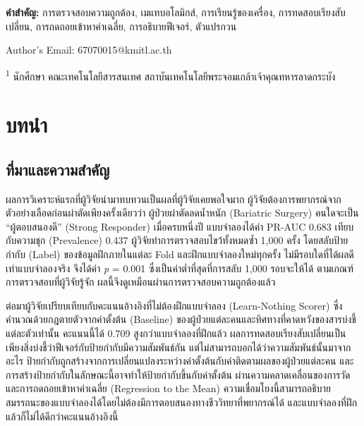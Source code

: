 \documentclass[11pt,a4paper]{article}
\begin{document}
\vspace{1em}
\noindent\textbf{คำสำคัญ:} การตรวจสอบความถูกต้อง, เมแทบอโลมิกส์, การเรียนรู้ของเครื่อง,
การทดสอบเรียงสับเปลี่ยน, การถดถอยเข้าหาค่าเฉลี่ย, การอธิบายฟีเจอร์, ตัวแปรกวน

\vfill
\noindent{}\par
{\small
\noindent * Author's Email: 67070015@kmitl.ac.th\par
\noindent\textsuperscript{1} นักศึกษา คณะเทคโนโลยีสารสนเทศ
สถาบันเทคโนโลยีพระจอมเกล้าเจ้าคุณทหารลาดกระบัง\par}

\twocolumn

\section{บทนำ}
\label{sec:intro}

\subsection{ที่มาและความสำคัญ}

ผลการวิเคราะห์แรกที่ผู้วิจัยนำมาทบทวนเป็นผลที่ผู้วิจัยเคยพอใจมาก
ผู้วิจัยต้องการพยากรณ์จากตัวอย่างเลือดก่อนผ่าตัดเพียงครั้งเดียวว่า
ผู้ป่วยผ่าตัดลดน้ำหนัก (Bariatric Surgery) คนใดจะเป็น ``ผู้ตอบสนองดี''
(Strong Responder) เมื่อครบหนึ่งปี แบบจำลองได้ค่า PR-AUC 0.683
เทียบกับความชุก (Prevalence) 0.437 ผู้วิจัยทำการตรวจสอบไขว้ทั้งหมดซ้ำ
1,000 ครั้ง โดยสลับป้ายกำกับ (Label) ของข้อมูลฝึกภายในแต่ละ Fold
และฝึกแบบจำลองใหม่ทุกครั้ง ไม่มีรอบใดที่ได้ผลดีเท่าแบบจำลองจริง จึงได้ค่า
\textit{p} = 0.001 ซึ่งเป็นค่าต่ำที่สุดที่การสลับ 1,000 รอบจะให้ได้
ตามเกณฑ์การตรวจสอบที่ผู้วิจัยรู้จัก ผลนี้จึงดูเหมือนผ่านการตรวจสอบความถูกต้องแล้ว

ต่อมาผู้วิจัยเปรียบเทียบกับคะแนนอ้างอิงที่ไม่ต้องฝึกแบบจำลอง (Learn-Nothing Scorer)
ซึ่งคำนวณด้วยกฎตายตัวจากค่าตั้งต้น (Baseline) ของผู้ป่วยแต่ละคนและทิศทางที่คาดหวังของสารบ่งชี้แต่ละตัวเท่านั้น
คะแนนนี้ได้ 0.709 สูงกว่าแบบจำลองที่ฝึกแล้ว
ผลการทดสอบเรียงสับเปลี่ยนเป็นเพียงสิ่งบ่งชี้ว่าฟีเจอร์กับป้ายกำกับมีความสัมพันธ์กัน
แต่ไม่สามารถบอกได้ว่าความสัมพันธ์นั้นมาจากอะไร
ป้ายกำกับถูกสร้างจากการเปลี่ยนแปลงระหว่างค่าตั้งต้นกับค่าติดตามผลของผู้ป่วยแต่ละคน
และการสร้างป้ายกำกับในลักษณะนี้อาจทำให้ป้ายกำกับขึ้นกับค่าตั้งต้น
ผ่านความคลาดเคลื่อนของการวัดและการถดถอยเข้าหาค่าเฉลี่ย (Regression to the Mean)
ความเชื่อมโยงนี้สามารถอธิบายสมรรถนะของแบบจำลองได้โดยไม่ต้องมีการตอบสนองทางชีววิทยาที่พยากรณ์ได้
และแบบจำลองที่ฝึกแล้วก็ไม่ได้ดีกว่าคะแนนอ้างอิงนี้
\end{document}
